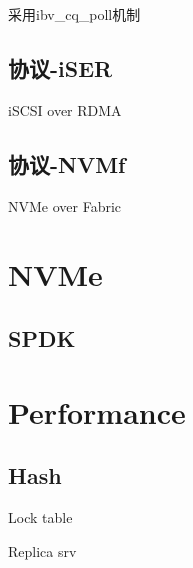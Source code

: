 采用ibv\_cq\_poll机制

\subsection{协议-iSER}

iSCSI over RDMA

\subsection{协议-NVMf}

NVMe over Fabric

\section{NVMe}

\subsection{SPDK}

\section{Performance}

\subsection{Hash}

\begin{enumbox}
\item Lock table
\item Replica srv
\end{enumbox}
